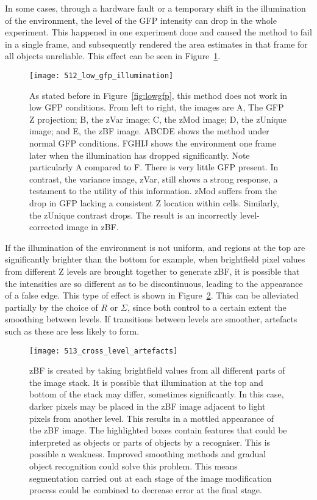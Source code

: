 In some cases, through a hardware fault or a temporary shift in the illumination of the environment, the level of the GFP intensity can drop in the whole experiment. This happened in one experiment done and caused the method to fail in a single frame, and subsequently rendered the area estimates in that frame for all objects unreliable. This effect can be seen in Figure~\ref{fig:lowgfpillumination}.

\begin{figure}[h!]
 \centering
 \texttt{[image: 512\_low\_gfp\_illumination]}
 \caption[Effects of low GFP illumination]{
 	As stated before in Figure~\ref{fig:lowgfp}, this method does not work in low GFP conditions. From left to right, the images are A, The GFP Z projection; B, the zVar image; C, the zMod image; D, the zUnique image; and E, the zBF image. ABCDE shows the method under normal GFP conditions. FGHIJ shows the environment one frame later when the illumination has dropped significantly. Note particularly A compared to F. There is very little GFP present. In contrast, the variance image, zVar, still shows a strong response, a testament to the utility of this information. zMod suffers from the drop in GFP lacking a consistent Z location within cells. Similarly, the zUnique contrast drops. The result is an incorrectly level-corrected image in zBF.
 }
 \label{fig:lowgfpillumination}
\end{figure}

If the illumination of the environment is not uniform, and regions at the top are significantly brighter than the bottom for example, when brightfield pixel values from different Z levels are brought together to generate zBF, it is possible that the intensities are so different as to be discontinuous, leading to the appearance of a false edge. This type of effect is shown in Figure~\ref{fig:crosslevelartefacts}. This can be alleviated partially by the choice of $R$ or $\Sigma$, since both control to a certain extent the smoothing between levels. If transitions between levels are smoother, artefacts such as these are less likely to form.

\begin{figure}[h!]
 \centering
 \texttt{[image: 513\_cross\_level\_artefacts]}
 \caption[Cross-level artefacts]{
 	zBF is created by taking brightfield values from all different parts of the image stack. It is possible that illumination at the top and bottom of the stack may differ, sometimes significantly. In this case, darker pixels may be placed in the zBF image adjacent to light pixels from another level. This results in a mottled appearance of the zBF image. The highlighted boxes contain features that could be interpreted as objects or parts of objects by a recogniser. This is possible a weakness. Improved smoothing methods and gradual object recognition could solve this problem. This means segmentation carried out at each stage of the image modification process could be combined to decrease error at the final stage.
 }
 \label{fig:crosslevelartefacts}
\end{figure}

